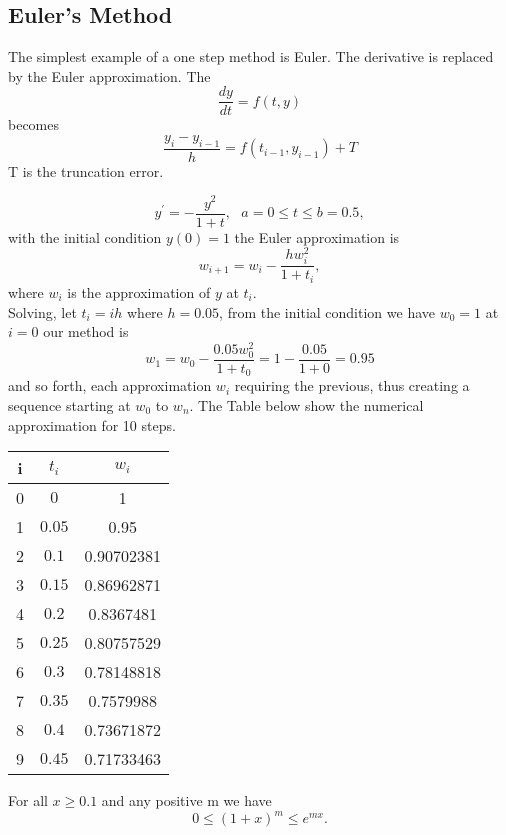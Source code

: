 \subsection{Euler's Method}
The simplest example of a one step method is Euler. The derivative is replaced
by the Euler approximation. The 
\[ \frac{dy}{dt}=f(t,y) \]
becomes
\[\frac{y_i-y_{i-1}}{h}=f(t_{i-1},y_{i-1}) +T\]
T is the truncation error.\\
\begin{example}
\[y^{'} = -\frac{y^2}{1+t}, \ \ \ a=0\leq t \leq b=0.5, \]
with the initial condition $y(0)=1$
the Euler approximation is
\[w_{i+1}=w_i -\frac{hw_i^2}{1+t_i}, \]
where $w_i$ is the approximation of $y$ at $t_i$.\\
Solving, let $t_i=ih$ where $h=0.05$, from the initial condition we have
$w_0=1$
at $i=0$ our method is 
\[w_1=w_0-\frac{0.05w^2_0}{1+t_0}=1-\frac{0.05}{1+0}=0.95 \]
and so forth, each approximation $w_i$ requiring the previous, thus creating a 
sequence starting at $w_0$ to $w_n$. The Table below show the numerical approximation for 10 steps.
\begin{center}
\begin{tabular}{ c| c |c }
  i& $t_i$& $w_i$\\
  \hline
 0 & $0$  & 1 \\  
 1 & $0.05$  & 0.95 \\  
 2 & $0.1$  & 0.90702381 \\  
 3 & $0.15$  & 0.86962871 \\  
 4 & $0.2$  & 0.8367481 \\  
 5 & $0.25$  & 0.80757529 \\  
 6 & $0.3$  & 0.78148818 \\  
 7 & $0.35$  & 0.7579988 \\  
 8 & $0.4$  & 0.73671872 \\  
 9 & $0.45$  & 0.71733463  
\end{tabular}
\end{center}
\end{example}

\begin{lemma}
\label{lemma 1}
For all $ x \geq 0.1$ and any positive m we have \[0\leq (1+x)^m \leq e^{mx}.\]
\end{lemma}

